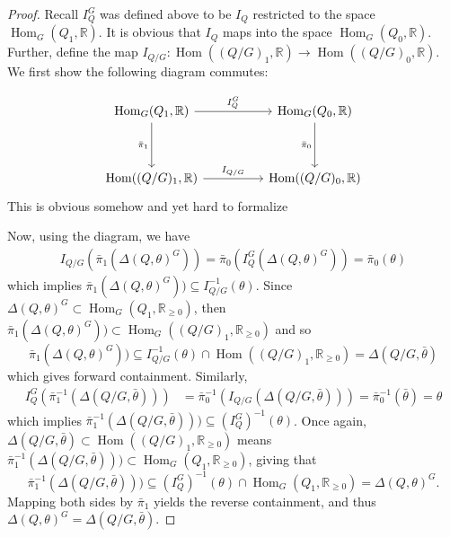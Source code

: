 \documentclass[11pt]{amsart}
\theoremstyle{plain}
\theoremstyle{definition}
\newcommand{\R}{\mathbb{R}}
\DeclareMathOperator{\Hom}{Hom}
\renewcommand{\hom}{\Hom}
\begin{document}
\begin{proof}
    Recall $I_Q^G$ was defined above to be $I_Q$ restricted to the space $\hom_G(Q_1, \R)$. It is obvious that $I_Q$ maps into the space $\hom_G(Q_0, \R)$. Further, define the map $I_{Q/G} : \hom((Q/G)_1, \R) \longrightarrow \hom((Q/G)_0, \R)$. We first show the following diagram commutes:

\[\begin{tikzcd}
	{\hom_G(Q_1, \R)} && {\hom_G(Q_0, \R)} \\
	\\
	{\hom((Q/G)_1, \R)} && {\hom((Q/G)_0, \R)}
	\arrow["{I_Q^G}", from=1-1, to=1-3]
	\arrow["{\bar\pi_1}"', from=1-1, to=3-1]
	\arrow["{\bar\pi_0}"', from=1-3, to=3-3]
	\arrow["{I_{Q/G}}", from=3-1, to=3-3]
\end{tikzcd}\]
\color{red}This is obvious somehow and yet hard to formalize
\color{black}

Now, using the diagram, we have
\begin{align*}
    I_{Q/G}(\bar\pi_1(\Delta(Q, \theta)^G)) = \bar\pi_0(I_Q^G(\Delta(Q, \theta)^G))
    = \bar\pi_0(\theta)
\end{align*}
which implies $\bar\pi_1(\Delta(Q, \theta)^G)) \subseteq I_{Q/G}^{-1}(\theta)$. Since $\Delta(Q, \theta)^G \subset \hom_G(Q_1, \R_{\geq 0})$, then $\bar\pi_1(\Delta(Q, \theta)^G)) \subset \hom_G((Q/G)_1, \R_{\geq 0})$ and so 
\[
\bar\pi_1(\Delta(Q, \theta)^G)) \subseteq I_{Q/G}^{-1}(\theta) \cap \hom((Q/G)_1, \R_{\geq 0}) = \Delta(Q/G, \bar\theta)
\]
which gives forward containment. Similarly,
\begin{align*}
    I_Q^G(\bar\pi_1^{-1}(\Delta(Q/G, \bar\theta))) &= \bar\pi_0^{-1}(I_{Q/G}(\Delta(Q/G, \bar\theta))) 
    = \bar\pi_0^{-1}(\bar\theta) 
    = \theta 
\end{align*}
which implies $\bar\pi_1^{-1}(\Delta(Q/G, \bar\theta))) \subseteq (I_Q^G)^{-1}(\theta)$. Once again, $\Delta(Q/G, \bar\theta) \subset \hom((Q/G)_1, \R_{\geq 0})$ means $\bar\pi_1^{-1}(\Delta(Q/G, \bar\theta))) \subset \hom_G(Q_1, \R_{\geq 0})$, giving that
\[
\bar\pi_1^{-1}(\Delta(Q/G, \bar\theta))) \subseteq (I_Q^G)^{-1}(\theta)\cap \hom_G(Q_1, \R_{\geq 0}) = \Delta(Q, \theta)^G.
\]
Mapping both sides by $\bar\pi_1$ yields the reverse containment, and thus $\Delta(Q, \theta)^G = \Delta(Q/G, \bar\theta)$.
\end{proof}



\newpage

 
\end{document}
